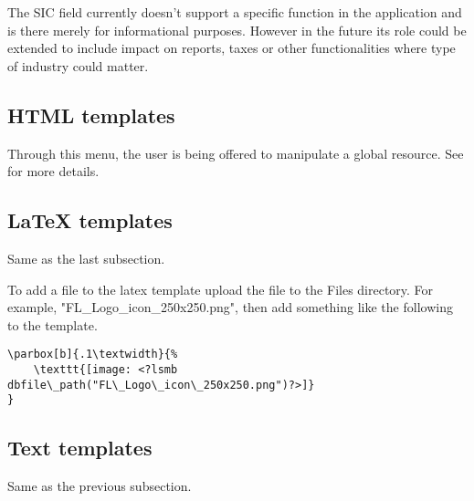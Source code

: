 The SIC field currently doesn't support a specific function in the application and is there
merely for informational purposes. However in the future its role could be extended to include
impact on reports, taxes or other functionalities where type of industry could matter.

\subsection{HTML templates}
\label{subsec-company-config-html-templates}

Through this menu, the user is being offered to manipulate a global resource. See
 for more details.

\subsection{LaTeX templates}
\label{subsec-company-config-latex-templates}

Same as the last subsection.

To add a file to the latex template upload the file to the Files directory.  For example, "FL\_Logo\_icon\_250x250.png", then add something like the following to the template.

\begin{verbatim}
\parbox[b]{.1\textwidth}{%
    \texttt{[image: <?lsmb dbfile\_path("FL\_Logo\_icon\_250x250.png")?>]}
}
\end{verbatim}

\subsection{Text templates}
\label{subsec-company-config-text-templates}

Same as the previous subsection.



